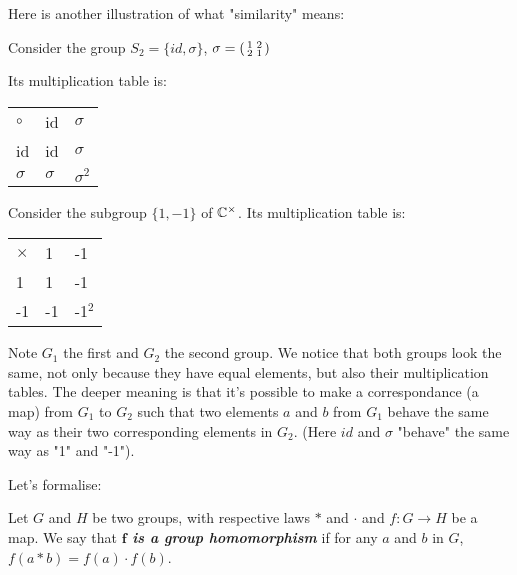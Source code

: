 Here is another illustration of what "similarity" means: 

Consider the group $S_2 = \{id, \sigma\}$, $\sigma=\begin{psmallmatrix}
    1 & 2 \\ 
    2 & 1
\end{psmallmatrix}$

Its multiplication table is: 
\begin{table}[h]
    \begin{tabular}{lll}
     $\circ$ & id & $\sigma$ \\ \cline{2-3} 
    \multicolumn{1}{l|}{id} & \multicolumn{1}{l|}{id} & \multicolumn{1}{l|}{$\sigma$} \\ \cline{2-3} 
    \multicolumn{1}{l|}{$\sigma$} & \multicolumn{1}{l|}{$\sigma$} & \multicolumn{1}{l|}{$\sigma^2$} \\ \cline{2-3} 
    \end{tabular}
\end{table}

Consider the subgroup $\{1, -1\}$ of $\mathbb{C}^\times$. Its multiplication table is: 
\begin{table}[h]
    \begin{tabular}{lll}
     $\times$ & 1 & -1 \\ \cline{2-3} 
    \multicolumn{1}{l|}{1} & \multicolumn{1}{l|}{1} & \multicolumn{1}{l|}{-1} \\ \cline{2-3} 
    \multicolumn{1}{l|}{-1} & \multicolumn{1}{l|}{-1} & \multicolumn{1}{l|}{-1$^2$} \\ \cline{2-3} 
    \end{tabular}
\end{table}

Note $G_1$ the first and $G_2$ the second group. We notice that both groups look the same, not only because they have equal elements, but also their multiplication tables. The deeper meaning is that it's possible to make a correspondance (a map) from $G_1$ to $G_2$ such that two elements $a$ and $b$ from $G_1$ behave the same way as their two corresponding elements in $G_2$. (Here $id$ and $\sigma$ "behave" the same way as "1" and "-1").

Let's formalise:
\begin{boxedDefinition}
    Let $G$ and $H$ be two groups, with respective laws $*$ and $\cdot$ and $f: G \longrightarrow H$ be a map. We say that \textbf{\textit{$\bm{f}$ is a group homomorphism}} if for any $a$ and $b$ in $G$, $f(a*b) = f(a)\cdot f(b)$.
\end{boxedDefinition}

